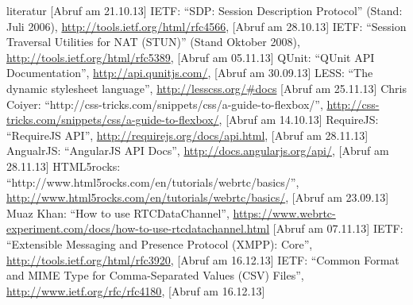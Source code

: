 \begin{thebibliography}{literatur}
		[Abruf am 21.10.13]
	 IETF:
		"`SDP: Session Description Protocol"' (Stand: Juli 2006),
		\hyperlink{http://tools.ietf.org/html/rfc4566}{http://tools.ietf.org/html/rfc4566},
		[Abruf am 28.10.13]
	 IETF:
		"`Session Traversal Utilities for NAT (STUN)"' (Stand Oktober 2008),
		\hyperlink{http://tools.ietf.org/html/rfc5389}{http://tools.ietf.org/html/rfc5389},
		[Abruf am 05.11.13]
	 QUnit: %
		"`QUnit API Documentation"',
		\hyperlink{http://api.qunitjs.com/}{http://api.qunitjs.com/},
		[Abruf am 30.09.13]
	 LESS:
		"`The dynamic stylesheet language"',
		\hyperlink{http://lesscss.org/\#docs}{http://lesscss.org/\#docs}
		[Abruf am 25.11.13]
	 Chris Coiyer:
		"`http://css-tricks.com/snippets/css/a-guide-to-flexbox/"',
		\hyperlink{http://css-tricks.com/snippets/css/a-guide-to-flexbox/}{http://css-tricks.com/snippets/css/a-guide-to-flexbox/},
		[Abruf am 14.10.13]
	 RequireJS:
		"`RequireJS API"',
		\hyperlink{http://requirejs.org/docs/api.html}{http://requirejs.org/docs/api.html},
		[Abruf am 28.11.13]
	 AngualrJS:
		"`AngularJS API Docs"',
		\hyperlink{http://docs.angularjs.org/api/}{http://docs.angularjs.org/api/},
		[Abruf am 28.11.13]
	 HTML5rocks:
		"`http://www.html5rocks.com/en/tutorials/webrtc/basics/"',
		\hyperlink{http://www.html5rocks.com/en/tutorials/webrtc/basics/}{http://www.html5rocks.com/en/tutorials/webrtc/basics/},
		[Abruf am 23.09.13]
	 Muaz Khan:
		"`How to use RTCDataChannel"',
		\hyperlink{https://www.webrtc-experiment.com/docs/how-to-use-rtcdatachannel.html}{https://www.webrtc-experiment.com/docs/how-to-use-rtcdatachannel.html}
		[Abruf am 07.11.13]
	 IETF:
		"`Extensible Messaging and Presence Protocol (XMPP): Core"',
		\hyperlink{http://tools.ietf.org/html/rfc3920}{http://tools.ietf.org/html/rfc3920},
		[Abruf am 16.12.13]
	 IETF:
		"`Common Format and MIME Type for Comma-Separated Values (CSV) Files"',
		\hyperlink{http://www.ietf.org/rfc/rfc4180}{http://www.ietf.org/rfc/rfc4180},
		[Abruf am 16.12.13]
\end{thebibliography}


\appendix
















\begin{landscape}
	
\end{landscape}


